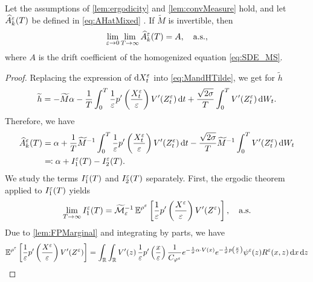 \documentclass[review,onefignum,onetabnum]{siamonline190516}
\begin{document}
\begin{theorem}\label{thm:mainTheorem} Let the assumptions of \cref{lem:ergodicity} and \cref{lem:convMeasure} hold, and let $\widehat A^\varepsilon_k(T)$ be defined in \eqref{eq:AHatMixed} . If $\widetilde M$ is invertible, then
	\begin{equation}
	\lim_{\varepsilon \to 0} \lim_{T \to \infty} \widehat A_k^\varepsilon(T) = A, \quad \text{a.s.},
	\end{equation}
	where $A$ is the drift coefficient of the homogenized equation \eqref{eq:SDE_MS}.
\end{theorem}

\begin{proof} Replacing the expression of $\mathrm{d} X^\varepsilon_t$ into \eqref{eq:MandHTilde}, we get for $\widetilde h$
\begin{equation}\label{Ahat_decomposition}
\widetilde h = -\widetilde M \alpha - \frac{1}{T} \int_0^T \frac{1}{\epl} p' \left ( \frac{X^\epl_t}{\epl} \right ) V'(Z^\epl_t) \dd t + \frac{\sqrt{2\sigma}}{T} \int_0^T V'(Z^\epl_t) \dd W_t.
\end{equation}
Therefore, we have
\begin{equation}\label{eq:alphaDecomposition}
\begin{aligned}
	\widehat A^\epl_k(T) &= \alpha + \frac{1}{T} \widetilde M^{-1} \int_0^T \frac{1}{\epl} p' \left ( \frac{X^\epl_t}{\epl} \right ) V'(Z^\epl_t) \dd t - \frac{\sqrt{2\sigma}}{T}  \widetilde M^{-1} \int_0^T V'(Z^\epl_t) \dd W_t\\
	&\eqdef \alpha + I_1^\epl(T) - I_2^\epl(T).
\end{aligned}
\end{equation}
We study the terms $I_1^\varepsilon(T)$ and $I_2^\varepsilon(T)$ separately. First, the ergodic theorem applied to $I_1^\varepsilon(T)$ yields
\begin{equation}\label{limit_estimator}
\lim_{T \to \infty} I_1^\epl(T) = \widetilde {\mathcal M}_\epl^{-1} \E^{\rho^\epl} \left [ \frac{1}{\epl} p' \left ( \frac{X^\epl}{\epl} \right ) V'(Z^\epl) \right ], \quad \text{a.s.}
\end{equation}
Due to \cref{lem:FPMarginal} and integrating by parts, we have
\begin{equation}
\begin{aligned}
	\E^{\rho^\epl} \left [ \frac{1}{\epl} p' \left ( \frac{X^\epl}{\epl} \right ) V'(Z^\epl) \right ] &= \int_{\R} \int_{\R} V'(z) \, \frac1\epl p' \left ( \frac{x}\epl \right ) \frac{1}{C_{\phi^\epl}} e^{- \frac{1}{\sigma} \alpha \cdot V(x)} e^{ - \frac{1}{\sigma} p \left ( \frac{x}\epl \right)} \psi^\epl(z) R^\epl(x,z) \dd x \dd z \\

\end{aligned}
\end{equation}
\end{proof}
\end{document}
